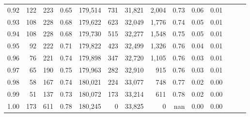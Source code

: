 \begin{tabular}{rrrrrrrrrrrrrr}
0.92 &    122 &  223 &  0.65 &  179,514 &      731 &  31,821 &   2,004 &  0.73 &  0.06 &      0.01 \\
0.93 &    108 &  228 &  0.68 &  179,622 &      623 &  32,049 &   1,776 &  0.74 &  0.05 &      0.01 \\
0.94 &    108 &  228 &  0.68 &  179,730 &      515 &  32,277 &   1,548 &  0.75 &  0.05 &      0.01 \\
0.95 &     92 &  222 &  0.71 &  179,822 &      423 &  32,499 &   1,326 &  0.76 &  0.04 &      0.01 \\
0.96 &     76 &  221 &  0.74 &  179,898 &      347 &  32,720 &   1,105 &  0.76 &  0.03 &      0.01 \\
0.97 &     65 &  190 &  0.75 &  179,963 &      282 &  32,910 &     915 &  0.76 &  0.03 &      0.01 \\
0.98 &     58 &  167 &  0.74 &  180,021 &      224 &  33,077 &     748 &  0.77 &  0.02 &      0.00 \\
0.99 &     51 &  137 &  0.73 &  180,072 &      173 &  33,214 &     611 &  0.78 &  0.02 &      0.00 \\
1.00 &    173 &  611 &  0.78 &  180,245 &        0 &  33,825 &       0 &   nan &  0.00 &      0.00 \\
\bottomrule
\end{tabular}
